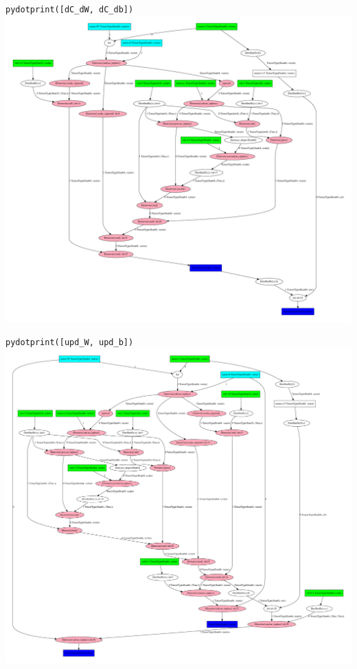 \documentclass[a4paper,9pt]{beamer}
\begin{document}
\begin{frame}{\texttt{pydotprint([dC\_dW, dC\_db])}}
    \center
    \includegraphics[height=0.9\textheight]{pydotprint_grad.pdf}
\end{frame}

\begin{frame}{\texttt{pydotprint([upd\_W, upd\_b])}}
    \center
    \includegraphics[height=0.9\textheight]{pydotprint_upd.pdf}
\end{frame}
\end{document}
